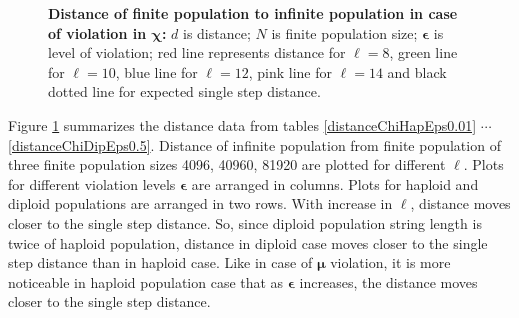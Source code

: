 \begin{figure}[h]
\begin{center}
\hspace{-3em}%
\caption[\textbf{Distance of finite population to infinite population in case of violation in $\bm{\chi}$}]{\textbf{Distance of finite population to infinite population in case of violation in $\bm{\chi}$:}  
  $d$ is distance; $N$ is finite population size; $\bm{\epsilon}$ is level of violation; 
  red line represents distance for $\ell = 8$, green line for $\ell = 10$, blue line for $\ell = 12$, pink line for $\ell = 14$ 
  and black dotted line for expected single step distance.}
\label{vio_chi_dist}
\end{center}
\end{figure}

Figure \ref{vio_chi_dist} summarizes the distance data from tables \ref{distanceChiHapEps0.01} $\cdots$ 
\ref{distanceChiDipEps0.5}. Distance of infinite population from finite population of 
three finite population sizes {4096, 40960, 81920} are plotted for different $\ell$. 
Plots for different violation levels $\bm{\epsilon}$ are arranged in columns. 
Plots for haploid and diploid populations are arranged in two rows. With increase in $\ell$, 
distance moves closer to the single step distance. So, since diploid population 
string length is twice of haploid population, 
distance in diploid case moves closer to the single step distance than in haploid case. 
Like in case of $\bm{\mu}$ violation, it is more noticeable in haploid population case that as $\bm{\epsilon}$ increases, 
the distance moves closer to the single step distance.

